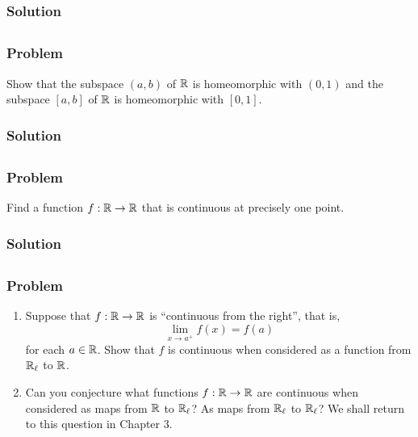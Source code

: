 \subsubsection{Solution}
\todo


\subsection{}

\subsubsection{Problem}
Show that the subspace $(a, b)$ of $\mathbb R$ is homeomorphic with $(0, 1)$ and the subspace $[a, b]$ of $\mathbb R$ is homeomorphic with $[0, 1]$.

\subsubsection{Solution}
\todo


\setcounter{subsection}{5} %
\subsection{}

\subsubsection{Problem}
Find a function $f : \mathbb R \to \mathbb R$ that is continuous at precisely one point.

\subsubsection{Solution}
\todo


\subsection{}

\subsubsection{Problem}
\begin{enumerate}
    \item Suppose that $f : \mathbb R \to \mathbb R$ is ``continuous from the right'', that is,
    \[ \lim_{x \to a^+}f(x) = f(a) \]
    for each $a \in \mathbb R$. Show that $f$ is continuous when considered as a function from $\mathbb R_\ell$ to $\mathbb R$.
    \item Can you conjecture what functions $f : \mathbb R \to \mathbb R$ are continuous when considered as maps from $\mathbb R$ to $\mathbb R_\ell$? As maps from $\mathbb R_\ell$ to $\mathbb R_\ell$? We shall return to this question in Chapter 3.
\end{enumerate}

